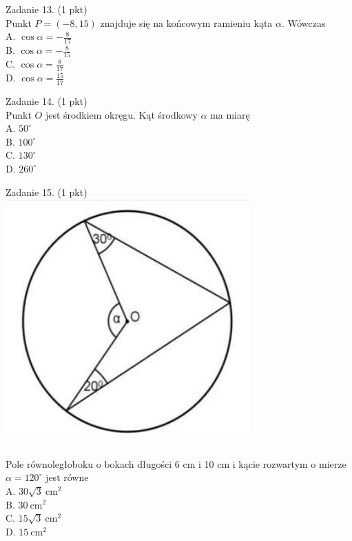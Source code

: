 \documentclass[10pt]{article}
\begin{document}
Zadanie 13. (1 pkt)\\
Punkt \(P=(-8,15)\) znajduje się na końcowym ramieniu kąta \(\alpha\). Wówczas\\
A. \(\cos \alpha=-\frac{8}{17}\)\\
B. \(\cos \alpha=-\frac{8}{15}\)\\
C. \(\cos \alpha=\frac{8}{17}\)\\
D. \(\cos \alpha=\frac{15}{17}\)

Zadanie 14. (1 pkt)\\
Punkt \(O\) jest środkiem okręgu. Kąt środkowy \(\alpha\) ma miarę\\
A. \(50^{\circ}\)\\
B. \(100^{\circ}\)\\
C. \(130^{\circ}\)\\
D. \(260^{\circ}\)

Zadanie 15. (1 pkt)\\
\includegraphics[max width=\textwidth, center]{2024_11_21_8e981e1ab2c7e641f462g-06}

Pole równoległoboku o bokach długości 6 cm i 10 cm i kącie rozwartym o mierze \(\alpha=120^{\circ}\) jest równe\\
A. \(30 \sqrt{3} \mathrm{~cm}^{2}\)\\
B. \(30 \mathrm{~cm}^{2}\)\\
C. \(15 \sqrt{3} \mathrm{~cm}^{2}\)\\
D. \(15 \mathrm{~cm}^{2}\)
\end{document}
